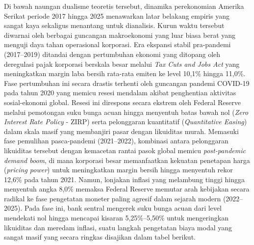 \documentclass[12pt,a4paper]{article}
\begin{document}
Di bawah naungan dualisme teoretis tersebut, dinamika perekonomian
Amerika Serikat periode 2017 hingga 2025 menawarkan latar belakang
empiris yang sangat kaya sekaligus menantang untuk dianalisis. Kurun
waktu tersebut diwarnai oleh berbagai guncangan makroekonomi yang luar
biasa berat yang menguji daya tahan operasional korporasi. Era ekspansi
stabil pra-pandemi (2017--2019) ditandai dengan pertumbuhan ekonomi yang
ditopang oleh deregulasi pajak korporasi berskala besar melalui
\emph{Tax Cuts and Jobs Act} yang meningkatkan margin laba bersih
rata-rata emiten ke level 10,1\% hingga 11,0\%. Fase pertumbuhan ini
secara drastis terhenti oleh guncangan pandemi COVID-19 pada tahun 2020
yang memicu resesi mendalam akibat penghentian aktivitas sosial-ekonomi
global. Resesi ini direspons secara ekstrem oleh Federal Reserve melalui
pemotongan suku bunga acuan hingga menyentuh batas bawah nol (\emph{Zero
Interest Rate Policy} - ZIRP) serta pelonggaran kuantitatif
(\emph{Quantitative Easing}) dalam skala masif yang membanjiri pasar
dengan likuiditas murah. Memasuki fase pemulihan pasca-pandemi
(2021--2022), kombinasi antara pelonggaran likuiditas tersebut dengan
kemacetan rantai pasok global memicu \emph{post-pandemic demand boom},
di mana korporasi besar memanfaatkan kekuatan penetapan harga
(\emph{pricing power}) untuk meningkatkan margin bersih hingga menyentuh
rekor 12,6\% pada tahun 2021. Namun, lonjakan inflasi yang melambung
tinggi hingga menyentuh angka 8,0\% memaksa Federal Reserve memutar arah
kebijakan secara radikal ke fase pengetatan moneter paling agresif dalam
sejarah modern (2022--2025). Pada fase ini, bank sentral mengerek suku
bunga acuan dari level mendekati nol hingga mencapai kisaran
5,25\%--5,50\% untuk mengeringkan likuiditas dan meredam inflasi, suatu
langkah pengetatan biaya modal yang sangat masif yang secara ringkas
disajikan dalam tabel berikut.
\end{document}
